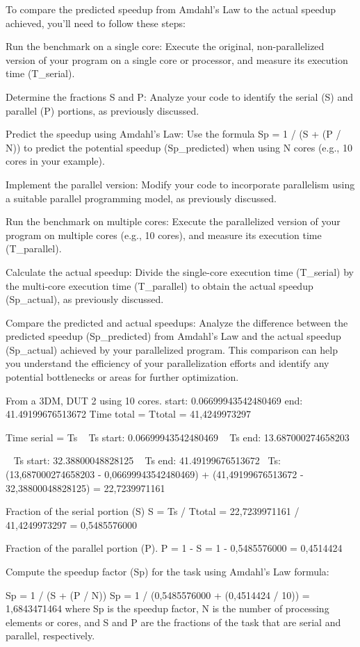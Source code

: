 To compare the predicted speedup from Amdahl's Law to the actual speedup achieved, you'll need to follow these steps:

    Run the benchmark on a single core: Execute the original, non-parallelized version of your program on a single core or processor, and measure its execution time (T_serial).

    Determine the fractions S and P: Analyze your code to identify the serial (S) and parallel (P) portions, as previously discussed.

    Predict the speedup using Amdahl's Law: Use the formula Sp = 1 / (S + (P / N)) to predict the potential speedup (Sp_predicted) when using N cores (e.g., 10 cores in your example).

    Implement the parallel version: Modify your code to incorporate parallelism using a suitable parallel programming model, as previously discussed.

    Run the benchmark on multiple cores: Execute the parallelized version of your program on multiple cores (e.g., 10 cores), and measure its execution time (T_parallel).

    Calculate the actual speedup: Divide the single-core execution time (T_serial) by the multi-core execution time (T_parallel) to obtain the actual speedup (Sp_actual), as previously discussed.

    Compare the predicted and actual speedups: Analyze the difference between the predicted speedup (Sp_predicted) from Amdahl's Law and the actual speedup (Sp_actual) achieved by your parallelized program. This comparison can help you understand the efficiency of your parallelization efforts and identify any potential bottlenecks or areas for further optimization.




From a 3DM, DUT 2 using 10 cores.
start: 0.06699943542480469
end: 41.49199676513672
Time total = Ttotal = 41,4249973297

Time serial = Ts
~ Ts start: 0.06699943542480469
~ Ts end: 13.687000274658203

~ Ts start: 32.38800048828125
~ Ts end: 41.49199676513672
~Ts: (13,687000274658203 - 0,06699943542480469) + (41,49199676513672 - 32,38800048828125) = 22,7239971161


Fraction of the serial portion (S)
S = Ts / Ttotal = 22,7239971161 / 41,4249973297 = 0,5485576000

Fraction of the parallel portion (P).
P = 1 - S = 1 - 0,5485576000 = 0,4514424


Compute the speedup factor (Sp) for the task using Amdahl's Law formula:

Sp = 1 / (S + (P / N))
Sp = 1 / (0,5485576000 + (0,4514424 / 10)) = 1,6843471464
where Sp is the speedup factor, N is the number of processing elements or cores, and S and P are the fractions of the task that are serial and parallel, respectively.